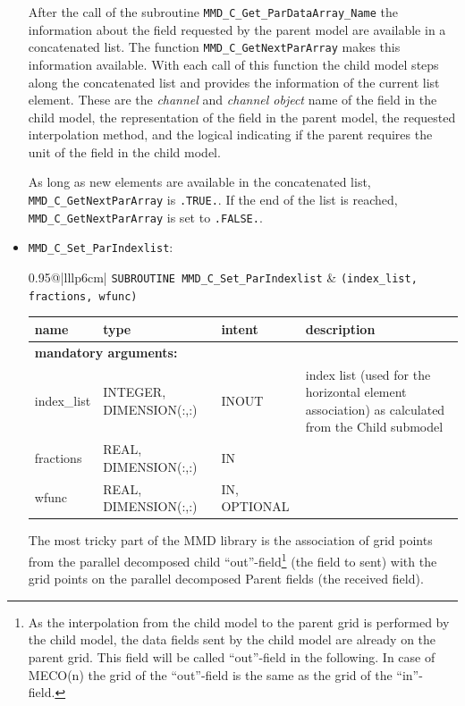 \documentclass[twoside]{article}
\begin{document}
\begin{itemize}
After the call of the subroutine \verb|MMD_C_Get_ParDataArray_Name|
the information about the field requested by the parent model are
available in a concatenated list. The
function \verb|MMD_C_GetNextParArray| makes this information
available. With each call of this function the child model steps along the
concatenated list and provides the information of the current list
element. These are the {\it channel} and {\it channel object} name of
the field in the child model, the representation of the field in the
parent model, the requested interpolation method, and the logical indicating
if the parent requires the unit of the field in the child model.

As long as new elements are available in the concatenated
list,  \verb|MMD_C_GetNextParArray| is \verb|.TRUE.|.
If the end of the list is reached,  \verb|MMD_C_GetNextParArray| is
set to \verb|.FALSE.|.

\item \verb|MMD_C_Set_ParIndexlist|:\\
\vspace*{-0.3cm}

\begin{tabular*}{0.95\textwidth}{@{\extracolsep\fill}|lllp{6cm}|}
\hline
{}
{\tt SUBROUTINE MMD\_C\_Set\_ParIndexlist} &
{\tt (index\_list, fractions, wfunc)}\\
\hline
\end{tabular*}
\begin{tabular*}{0.95\textwidth}{@{\extracolsep\fill}|lllp{6cm}|}
name & type & intent & description\\
\hline
\multicolumn{4}{|l|}{\bf mandatory arguments:}\\
index\_list & {\footnotesize INTEGER, DIMENSION(:,:)} &INOUT & index
list (used for the horizontal element association) as calculated from
the Child submodel \\ 
fractions  & {\footnotesize REAL, DIMENSION(:,:)} &IN           & \\
wfunc      & {\footnotesize REAL, DIMENSION(:,:)} &IN, OPTIONAL & \\
\hline
\end{tabular*}
\smallskip

The most tricky part of the MMD library is the association of grid points from 
the parallel decomposed child ``out''-field\footnote{As the interpolation from
the child model to the parent grid is performed by the 
child model, the data fields sent by the child model are already on the
parent grid. This field will be called ``out''-field in the
following. In case of MECO(n) the grid of the ``out''-field is the
same as the grid of the ``in''-field.} (the field to sent) with
the grid points on the parallel decomposed Parent fields (the received
field). 


\end{itemize}
\end{document}
